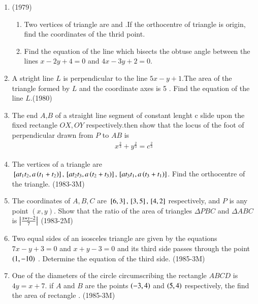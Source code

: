 \documentclass[journal,12pt,twocolumn]{IEEEtran}
\theoremstyle{remark}
\begin{document}
 \begin{enumerate}[start=4]


\item                    	\hfill{(1979)}
	\begin{enumerate}
             \item     Two vertices of triangle are  and .If the orthocentre of triangle is origin, find the coordinates of the thrid point.
	     \item  Find the equation of the line which bisects the obtuse angle between  the lines $x-2y+4=0$ and $4x-3y+2=0$.
         \end{enumerate}

\item A stright line $L$ is perpendicular to the line $5x-y+1$.The area of the triangle formed by $L$ and the coordinate axes is 5 . Find the equation of the line $L$.\hfill{(1980)}

\item The end $A$,$B$ of a straight line segment of constant lenght c slide upon the fixed rectangle $ OX,OY$ respectively.then show that the locus of the foot of perpendicular drawn from $P$ to $AB$ is 
 \begin{align*}  x^\frac{2}{3} + y^\frac{2}{3} = c^\frac{2}{3} \end{align*}

  \item The vertices of a triangle are ${}\left[ at_1t_2,a\left(t_1+t_2\right)\right],\\ {}\left[ at_2t_3,a\left(t_2+t_3\right)\right],{}\left[at_3t_1,a\left(t_3+t_1\right)\right]$. Find the orthocentre of the triangle. \hfill{(1983-3M)}
	  
\item The coordinates of $A,B,C$ are $ {}\left[6,3\right] ,{}\left[3,5\right] , {}\left[4,2\right] $ respectively, and $P$ is any point $(x,y)$.
Show that the ratio of the area of triangles $\Delta PBC$  and $\Delta ABC$ is $\left\vert\frac{x+y-2}{7}\right\vert$ \hfill{(1983-2M)} 

\item Two equal sides of an isosceles triangle are given by the equations $7x-y+3=0$ and $x+y-3=0$ and its third side passes through the point $\left(1,-10\right)$ . Determine the equation of the third side.  \hfill{(1985-3M)}

\item One of the diameters of the circle circumscribing the rectangle $ABCD$ is $4y=x+ 7$. if $A$ and $B$ are the points $\left(-3,4\right)$ and $\left(5,4\right)$ respectively, the find the area of rectangle .  \hfill{(1985-3M)}



\end{enumerate}
\end{document}
